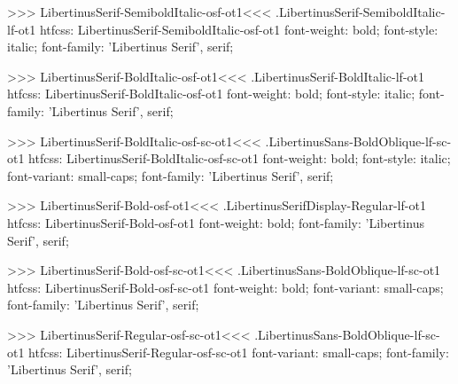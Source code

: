 {{{{>>>
\<LibertinusSerif-SemiboldItalic-osf-ot1\><<<
.LibertinusSerif-SemiboldItalic-lf-ot1
htfcss:  LibertinusSerif-SemiboldItalic-osf-ot1  font-weight: bold; font-style: italic; font-family: 'Libertinus Serif', serif;

>>>
\<LibertinusSerif-BoldItalic-osf-ot1\><<<
.LibertinusSerif-BoldItalic-lf-ot1
htfcss:  LibertinusSerif-BoldItalic-osf-ot1  font-weight: bold; font-style: italic; font-family: 'Libertinus Serif', serif;

>>>
\<LibertinusSerif-BoldItalic-osf-sc-ot1\><<<
.LibertinusSans-BoldOblique-lf-sc-ot1
htfcss:  LibertinusSerif-BoldItalic-osf-sc-ot1  font-weight: bold; font-style: italic; font-variant: small-caps; font-family: 'Libertinus Serif', serif;

>>>
\<LibertinusSerif-Bold-osf-ot1\><<<
.LibertinusSerifDisplay-Regular-lf-ot1
htfcss:  LibertinusSerif-Bold-osf-ot1  font-weight: bold; font-family: 'Libertinus Serif', serif;

>>>
\<LibertinusSerif-Bold-osf-sc-ot1\><<<
.LibertinusSans-BoldOblique-lf-sc-ot1
htfcss:  LibertinusSerif-Bold-osf-sc-ot1  font-weight: bold; font-variant: small-caps; font-family: 'Libertinus Serif', serif;

>>>
\<LibertinusSerif-Regular-osf-sc-ot1\><<<
.LibertinusSans-BoldOblique-lf-sc-ot1
htfcss:  LibertinusSerif-Regular-osf-sc-ot1  font-variant: small-caps; font-family: 'Libertinus Serif', serif;

}}}}

